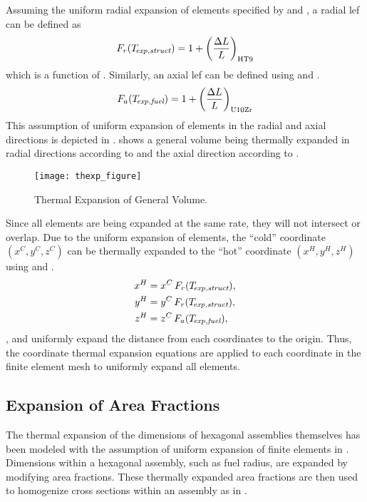     Assuming the uniform radial expansion of elements specified by
     and \texpstruct, a radial \gls{lef} can be defined as
    \begin{equation}
      \label{eq:lef_r}
      F_r(T_{\!\mbox{\scriptsize \em exp,struct}}) = 1 + \left(\frac{\Delta L}{L}\right)_{\text{HT9}}
    \end{equation}
    which is a function of \texpstruct. Similarly, an axial \gls{lef} can be
    defined using  and \texpfuel.
    \begin{equation}
      \label{eq:lef_a}
      F_a({T_{\!\mbox{\scriptsize \em exp,fuel}}}) = 1 + \left(\frac{\Delta L}{L}\right)_{\text{U10Zr}}
    \end{equation}
    This assumption of uniform expansion of elements in the radial and axial
    directions is depicted in . 
    shows a general volume being thermally expanded in radial directions
    according to  and the axial direction according to
    .

    \begin{figure}
      \centering
      \texttt{[image: thexp\_figure]}
      \caption{Thermal Expansion of General Volume.}
      \label{fig:thexp_figure}
    \end{figure}

    Since all elements are being expanded at the same rate, they will not
    intersect or overlap. Due to the uniform expansion of elements, the ``cold''
    coordinate $(x^C,y^C,z^C)$ can be thermally expanded to the ``hot''
    coordinate $(x^H,y^H,z^H)$ using  and .
    \begin{align}
      \label{eq:expand_x}
      x^H &= x^C \, F_r(T_{\!\mbox{\scriptsize \em exp,struct}}), \\
      \label{eq:expand_y}
      y^H &= y^C \, F_r(T_{\!\mbox{\scriptsize \em exp,struct}}), \\
      \label{eq:expand_z}
      z^H &= z^C \, F_a({T_{\!\mbox{\scriptsize \em exp,fuel}}}),
    \end{align}
    ,  and  uniformly
    expand the distance from each coordinates to the origin. Thus,
    the coordinate thermal expansion equations are applied to each coordinate in 
    the finite element mesh to uniformly expand all elements.

  \subsection{Expansion of Area Fractions}
    \label{sec:expansion_of_area_fractions}
    The thermal expansion of the dimensions of hexagonal assemblies themselves 
    has been modeled with the assumption of uniform expansion of finite elements
    in . Dimensions within a hexagonal
    assembly, such as fuel radius, are expanded by modifying area fractions.
    These thermally expanded area fractions are then used to homogenize cross
    sections within an assembly as in .

